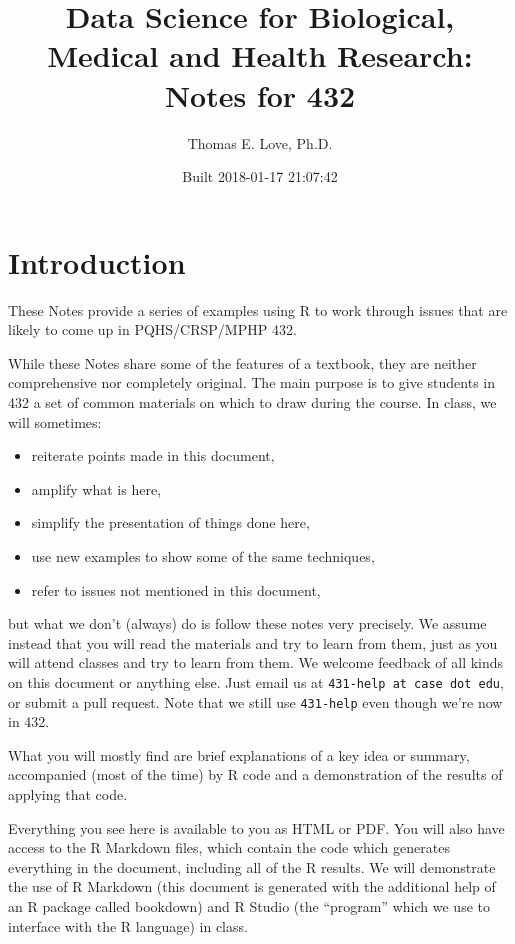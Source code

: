 \documentclass[]{book}
\title{Data Science for Biological, Medical and Health Research: Notes for 432}
\author{Thomas E. Love, Ph.D.}
\date{Built 2018-01-17 21:07:42}
\providecommand{\tightlist}{%
  \setlength{\itemsep}{0pt}\setlength{\parskip}{0pt}}
\theoremstyle{definition}
\theoremstyle{definition}
\theoremstyle{definition}
\theoremstyle{remark}
\begin{document}
\maketitle

{
\setcounter{tocdepth}{1}
\tableofcontents
}
\chapter*{Introduction}\label{introduction}

These Notes provide a series of examples using R to work through issues
that are likely to come up in PQHS/CRSP/MPHP 432.

While these Notes share some of the features of a textbook, they are
neither comprehensive nor completely original. The main purpose is to
give students in 432 a set of common materials on which to draw during
the course. In class, we will sometimes:

\begin{itemize}
\tightlist
\item
  reiterate points made in this document,
\item
  amplify what is here,
\item
  simplify the presentation of things done here,
\item
  use new examples to show some of the same techniques,
\item
  refer to issues not mentioned in this document,
\end{itemize}

but what we don't (always) do is follow these notes very precisely. We
assume instead that you will read the materials and try to learn from
them, just as you will attend classes and try to learn from them. We
welcome feedback of all kinds on this document or anything else. Just
email us at \texttt{431-help\ at\ case\ dot\ edu}, or submit a pull
request. Note that we still use \texttt{431-help} even though we're now
in 432.

What you will mostly find are brief explanations of a key idea or
summary, accompanied (most of the time) by R code and a demonstration of
the results of applying that code.

Everything you see here is available to you as HTML or PDF. You will
also have access to the R Markdown files, which contain the code which
generates everything in the document, including all of the R results. We
will demonstrate the use of R Markdown (this document is generated with
the additional help of an R package called bookdown) and R Studio (the
``program'' which we use to interface with the R language) in class.
\end{document}
